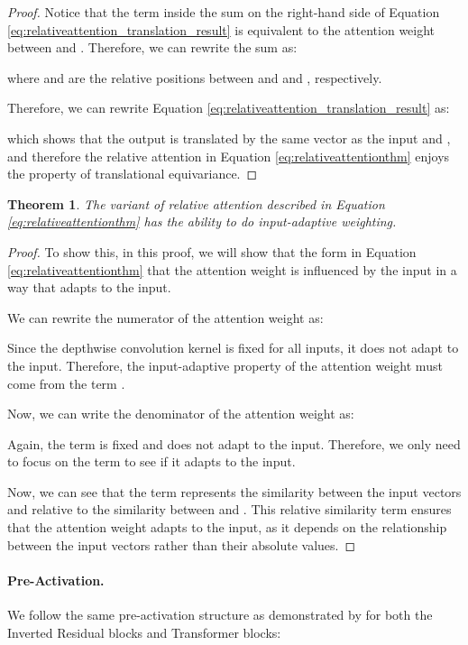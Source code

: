 \documentclass{article} \usepackage{iclr2023_conference,times}
\newtheorem{theorem}{Theorem}
\begin{document}
\begin{proof}
Notice that the term inside the sum on the right-hand side of Equation \ref{eq:relativeattention_translation_result} is equivalent to the attention weight between  and . Therefore, we can rewrite the sum as:



where  and  are the relative positions between  and  and , respectively.

Therefore, we can rewrite Equation \ref{eq:relativeattention_translation_result} as:



which shows that the output  is translated by the same vector  as the input  and , and therefore the relative attention in Equation \ref{eq:relativeattentionthm} enjoys the property of translational equivariance.
\end{proof}

\begin{theorem}
The variant of relative attention described in Equation \ref{eq:relativeattentionthm} has the ability to do input-adaptive weighting.
\end{theorem}
\begin{proof}
To show this, in this proof, we will show that the form in Equation \ref{eq:relativeattentionthm} that the attention weight  is influenced by the input  in a way that adapts to the input.

We can rewrite the numerator of the attention weight as:



Since the depthwise convolution kernel  is fixed for all inputs, it does not adapt to the input. Therefore, the input-adaptive property of the attention weight must come from the term .

Now, we can write the denominator of the attention weight as:



Again, the term  is fixed and does not adapt to the input. Therefore, we only need to focus on the term  to see if it adapts to the input.



Now, we can see that the term  represents the similarity between the input vectors  and  relative to the similarity between  and . This relative similarity term ensures that the attention weight adapts to the input, as it depends on the relationship between the input vectors rather than their absolute values.
\end{proof}

\paragraph{Pre-Activation.} We follow the same pre-activation structure as demonstrated by \cite{dai2021coatnet} for both the Inverted Residual blocks and Transformer blocks:
\end{document}
